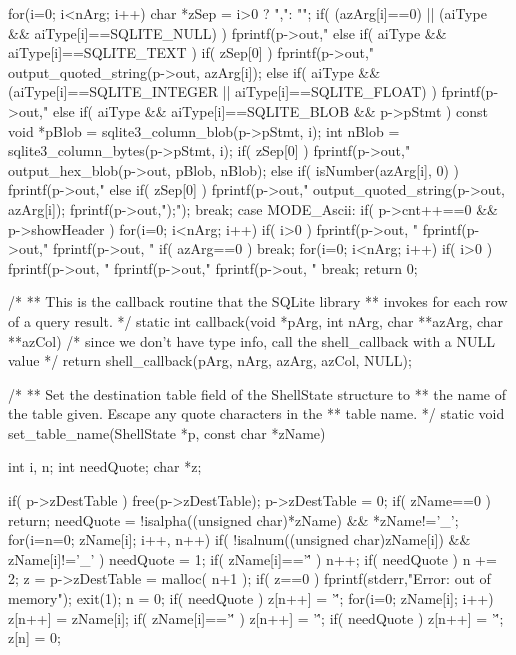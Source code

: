 \begin{Codex}[label=shell.c,numbers=left]
{{{{      for(i=0; i<nArg; i++){
        char *zSep = i>0 ? ",": "";
        if( (azArg[i]==0) || (aiType && aiType[i]==SQLITE_NULL) ){
          fprintf(p->out,"%
        }else if( aiType && aiType[i]==SQLITE_TEXT ){
          if( zSep[0] ) fprintf(p->out,"%
          output_quoted_string(p->out, azArg[i]);
        }else if( aiType && (aiType[i]==SQLITE_INTEGER
                             || aiType[i]==SQLITE_FLOAT) ){
          fprintf(p->out,"%
        }else if( aiType && aiType[i]==SQLITE_BLOB && p->pStmt ){
          const void *pBlob = sqlite3_column_blob(p->pStmt, i);
          int nBlob = sqlite3_column_bytes(p->pStmt, i);
          if( zSep[0] ) fprintf(p->out,"%
          output_hex_blob(p->out, pBlob, nBlob);
        }else if( isNumber(azArg[i], 0) ){
          fprintf(p->out,"%
        }else{
          if( zSep[0] ) fprintf(p->out,"%
          output_quoted_string(p->out, azArg[i]);
        }
      }
      fprintf(p->out,");\n");
      break;
    }
    case MODE_Ascii: {
      if( p->cnt++==0 && p->showHeader ){
        for(i=0; i<nArg; i++){
          if( i>0 ) fprintf(p->out, "%
          fprintf(p->out,"%
        }
        fprintf(p->out, "%
      }
      if( azArg==0 ) break;
      for(i=0; i<nArg; i++){
        if( i>0 ) fprintf(p->out, "%
        fprintf(p->out,"%
      }
      fprintf(p->out, "%
      break;
    }
  }
  return 0;
}

/*
** This is the callback routine that the SQLite library
** invokes for each row of a query result.
*/
static int callback(void *pArg, int nArg, char **azArg, char **azCol){
  /* since we don't have type info, call the shell_callback with a NULL value */
  return shell_callback(pArg, nArg, azArg, azCol, NULL);
}

/*
** Set the destination table field of the ShellState structure to
** the name of the table given.  Escape any quote characters in the
** table name.
*/
static void set_table_name(ShellState *p, const char *zName){
  int i, n;
  int needQuote;
  char *z;

  if( p->zDestTable ){
    free(p->zDestTable);
    p->zDestTable = 0;
  }
  if( zName==0 ) return;
  needQuote = !isalpha((unsigned char)*zName) && *zName!='_';
  for(i=n=0; zName[i]; i++, n++){
    if( !isalnum((unsigned char)zName[i]) && zName[i]!='_' ){
      needQuote = 1;
      if( zName[i]=='\'' ) n++;
    }
  }
  if( needQuote ) n += 2;
  z = p->zDestTable = malloc( n+1 );
  if( z==0 ){
    fprintf(stderr,"Error: out of memory\n");
    exit(1);
  }
  n = 0;
  if( needQuote ) z[n++] = '\'';
  for(i=0; zName[i]; i++){
    z[n++] = zName[i];
    if( zName[i]=='\'' ) z[n++] = '\'';
  }
  if( needQuote ) z[n++] = '\'';
  z[n] = 0;
}

}
\end{Codex}
